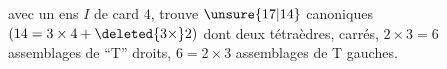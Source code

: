 avec un ens \(I\) de card \(4\),
 trouve \(\unsure{17|14}\)   canoniques 
\((14=3\times4+\deleted{3\times}2)\)
dont deux tétraèdres,
 carrés,  \(2\times3=6\)
assemblages de  ``T'' droits,
\(6=2\times3\) assemblages de  T gauches.
